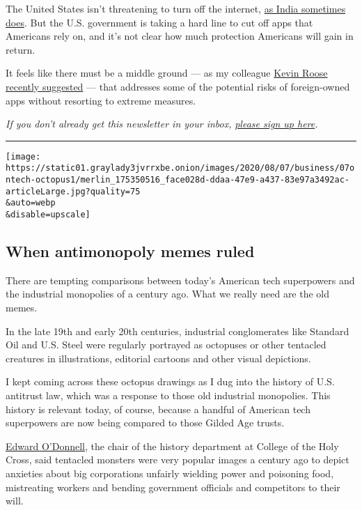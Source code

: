 The United States isn't threatening to turn off the internet,
\href{https://www.nytimes3xbfgragh.onion/2020/01/26/world/asia/kashmir-internet-shutdown-india.html}{as
India sometimes does}. But the U.S. government is taking a hard line to
cut off apps that Americans rely on, and it's not clear how much
protection Americans will gain in return.

It feels like there must be a middle ground --- as my colleague
\href{https://www.nytimes3xbfgragh.onion/2020/07/26/technology/tiktok-china-ban-model.html}{Kevin
Roose recently suggested} --- that addresses some of the potential risks
of foreign-owned apps without resorting to extreme measures.

\emph{If you don't already get this newsletter in your inbox,}
\href{https://www.nytimes3xbfgragh.onion/newsletters/signup/OT}{\emph{please
sign up here}}\emph{.}

\begin{center}\rule{0.5\linewidth}{\linethickness}\end{center}

\texttt{[image: https://static01.graylady3jvrrxbe.onion/images/2020/08/07/business/07ontech-octopus1/merlin\_175350516\_face028d-ddaa-47e9-a437-83e97a3492ac-articleLarge.jpg?quality=75\\\&auto=webp\\\&disable=upscale]}

\hypertarget{when-antimonopoly-memes-ruled}{%
\subsection{When antimonopoly memes
ruled}\label{when-antimonopoly-memes-ruled}}

There are tempting comparisons between today's American tech superpowers
and the industrial monopolies of a century ago. What we really need are
the old memes.

In the late 19th and early 20th centuries, industrial conglomerates like
Standard Oil and U.S. Steel were regularly portrayed as octopuses or
other tentacled creatures in illustrations, editorial cartoons and other
visual depictions.

I kept coming across these octopus drawings as I dug into the history of
U.S. antitrust law, which was a response to those old industrial
monopolies. This history is relevant today, of course, because a handful
of American tech superpowers are now being compared to those Gilded Age
trusts.

\href{https://www.holycross.edu/academics/programs/history/faculty/edward-t-odonnell}{Edward
O'Donnell}, the chair of the history department at College of the Holy
Cross, said tentacled monsters were very popular images a century ago to
depict anxieties about big corporations unfairly wielding power and
poisoning food, mistreating workers and bending government officials and
competitors to their will.

